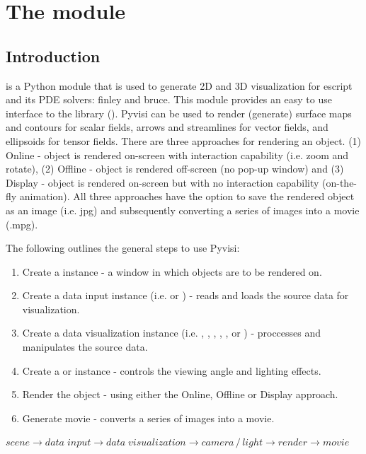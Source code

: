 \chapter{The module \pyvisi}
\label{PYVISI CHAP}

\section{Introduction}
\pyvisi is a Python module that is used to generate 2D and 3D visualization 
for escript and its PDE solvers: finley and bruce. This module provides 
an easy to use interface to the \VTK library (\VTKUrl). Pyvisi can be used to 
render (generate) surface maps and contours for scalar fields, arrows and 
streamlines for vector fields, and ellipsoids for tensor fields.  
There are three 
approaches for rendering an object. (1) Online - object is rendered on-screen 
with interaction capability (i.e. zoom and rotate), (2) Offline - object is 
rendered off-screen (no pop-up window) and (3) Display - object is rendered 
on-screen but with no interaction capability (on-the-fly 
animation). All three approaches have the option to save the rendered object 
as an image (i.e. jpg) and subsequently converting a series of images into a 
movie (.mpg).

The following outlines the general steps to use Pyvisi:

\begin{enumerate}
\item Create a \Scene instance - a window in which objects are to be 
rendered on.
\item Create a data input instance (i.e. \DataCollector or \ImageReader) - 
reads and loads the source data for visualization.
\item Create a data visualization instance (i.e. \Map, \Velocity, \Ellipsoid, 
\Contour, \Carpet, \StreamLine or \Image) -  proccesses and manipulates 
the source data.
\item Create a \Camera or \Light instance - controls the viewing angle and
lighting effects.
\item Render the object - using either the Online, Offline or Display approach.
\item Generate movie - converts a series of images into a movie.
\end{enumerate}
\begin{center}
\begin{math}
scene \rightarrow data \; input \rightarrow data \; visualization \rightarrow 
camera \, / \, light \rightarrow render \rightarrow movie
\end{math}
\end{center}

